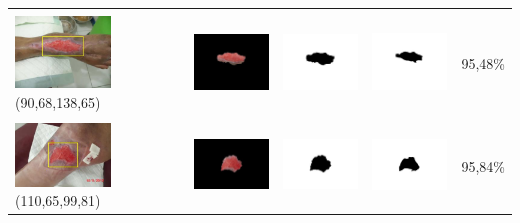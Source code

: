 \begin{table}[H]
\begin{tabular}{|m{1.0in}|m{1.0in}|m{1.0in}|m{1.0in}|m{0.6in}|}
		&  &  & \\
		\includegraphics[width=1.0in]{gambar/hasil_segmentasi/luka_merah/image_6_rect.jpg} {\centering\fontsize{10}{10}\selectfont(90,68,138,65)}&
		\includegraphics[width=1.0in]{gambar/hasil_segmentasi/luka_merah/result_6.jpg}&
		\includegraphics[width=1.0in]{gambar/hasil_segmentasi/luka_merah/mask_r_6.jpg}&
		\includegraphics[width=1.0in]{gambar/hasil_segmentasi/luka_merah/6_r.jpg}&
		95,48\% \\
		\hline

		&  &  & \\
		\includegraphics[width=1.0in]{gambar/hasil_segmentasi/luka_merah/image_7_rect.jpg} {\centering\fontsize{10}{10}\selectfont(110,65,99,81)}&
		\includegraphics[width=1.0in]{gambar/hasil_segmentasi/luka_merah/result_7.jpg}&
		\includegraphics[width=1.0in]{gambar/hasil_segmentasi/luka_merah/mask_r_7.jpg}&
		\includegraphics[width=1.0in]{gambar/hasil_segmentasi/luka_merah/7_r.jpg}&
		95,84\% \\
		\hline


\end{tabular}
\end{table}

